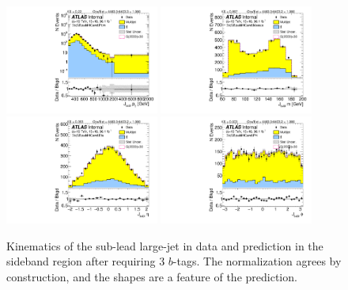 \begin{figure}[htbp!]
\begin{center}
\includegraphics[width=0.45\textwidth,angle=-90]{figures/boosted/Sideband/b77_ThreeTag_Sideband_sublHCand_Pt_m_1.pdf}
\includegraphics[width=0.45\textwidth,angle=-90]{figures/boosted/Sideband/b77_ThreeTag_Sideband_sublHCand_Mass_s.pdf}\\
\includegraphics[width=0.45\textwidth,angle=-90]{figures/boosted/Sideband/b77_ThreeTag_Sideband_sublHCand_Eta.pdf}
\includegraphics[width=0.45\textwidth,angle=-90]{figures/boosted/Sideband/b77_ThreeTag_Sideband_sublHCand_Phi.pdf}
  \caption{Kinematics of the sub-lead large-\R jet in data and prediction in the sideband region after requiring 3 $b$-tags. The normalization agrees by construction, and the shapes are a feature of the prediction.}
  \label{fig:boosted-3b-sideband-ak10-subl}
\end{center}
\end{figure}

